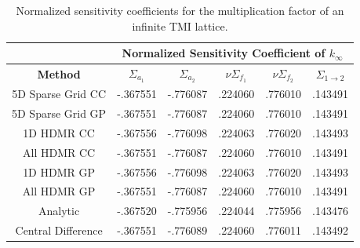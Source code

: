 
\begin{table}[!htb] 
\caption{\label{table:kinf_sensitivities} 
Normalized sensitivity coefficients for the multiplication factor of an infinite TMI lattice.}
\centering
\begin{tabular}{||c|c|c|c|c|c||} 
\hline \hline
  & \multicolumn{5}{|c||}{\textbf{Normalized Sensitivity Coefficient of $k_{\infty}$}}  \\ \hline
\textbf{Method} & $\Sigma_{a_1}$ & $\Sigma_{a_2}$ & $\nu\Sigma_{f_1}$ & $\nu\Sigma_{f_2}$ & $\Sigma_{1\rightarrow 2}$ \\ \hline
5D Sparse Grid CC  & -.367551 & -.776087 & .224060 & .776010 & .143491 \\ \hline
5D Sparse Grid GP  & -.367551 & -.776087 & .224060 & .776010 & .143491 \\ \hline
1D HDMR CC         & -.367556 & -.776098 & .224063 & .776020 & .143493 \\ \hline
All HDMR CC        & -.367551 & -.776087 & .224060 & .776010 & .143491 \\ \hline
1D HDMR GP         & -.367556 & -.776098 & .224063 & .776020 & .143493 \\ \hline
All HDMR GP        & -.367551 & -.776087 & .224060 & .776010 & .143491 \\ \hline
Analytic           & -.367520 & -.775956 & .224044 & .775956 & .143476 \\ \hline
Central Difference & -.367551 & -.776089 & .224060 & .776011 & .143492 \\
\hline \hline
\end{tabular}
\end{table}